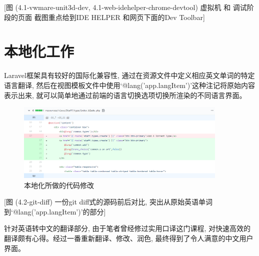 [图 (4.1-vwmare-unit3d-dev, 4.1-web-idehelper-chrome-devtool) 虚拟机 和 调试阶段的页面 截图重点给到IDE HELPER 和网页下面的Dev Toolbar]

\section{本地化工作}

Laravel框架具有较好的国际化兼容性, 通过在资源文件中定义相应英文单词的特定语言翻译, 然后在视图模板文件中使用`@lang('app.langItem')'这种注记将原始内容表示出来, 就可以简单地通过前端的语言切换选项切换所渲染的不同语言界面。

\begin{figure}[ht]
    \centering
    \includegraphics[width=0.9\textwidth]{support-files/4.2-git-diff.png}
    \caption{本地化所做的代码修改}
    \label{fig:localdiff}
\end{figure}

[图 (4.2-git-diff) 一份git diff式的源码前后对比, 突出从原始英语单词到`@lang('app.langItem')'的部分]

针对英语转中文的翻译部分, 由于笔者曾经修过实用口译这门课程, 对快速高效的翻译颇有心得。经过一番重新翻译、修改、润色, 最终得到了令人满意的中文用户界面。

